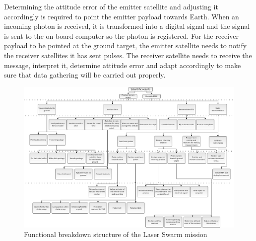 Determining the attitude error of the emitter satellite and adjusting  it accordingly is required to point the emitter payload towards Earth. When an incoming photon is received, it is transformed into a digital signal and the signal is sent to the on-board computer so the photon is registered. For the receiver payload to be pointed at the ground target, the emitter satellite needs to notify the receiver satellites it has sent pulses. The receiver satellite needs to receive the message, interpret it, determine attitude error and adapt accordingly to make sure that data gathering will be carried out properly. 

\begin{landscape}
\begin{figure}[h!]
\centering
\includegraphics[width=1.3\textheight]{chapters/img/FBD.jpg}
\caption{Functional breakdown structure of the Laser Swarm mission}
\label{FBS}
\end{figure}
\end{landscape}


